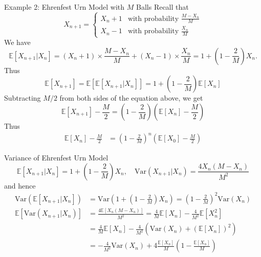 \documentclass[letterpaper]{beamer}
\def\E{\mathbb E}
\def\V{\mathrm{Var}}
\begin{document}
\begin{frame}{Example 2: Ehrenfest Urn Model with $M$ Balls}
Recall that
$$
X_{n+1}=
\begin{cases}
X_n+1 & \text{with probability } \frac{M-X_n}{M}\\
X_n-1 & \text{with probability } \frac{X_n}{M}
\end{cases}
$$
We have
$$
\E[X_{n+1}|X_n]=(X_n+1)\times \frac{M-X_n}{M}+(X_n-1)\times\frac{X_n}{M}=1+\left(1-\frac{2}{M}\right)X_n.
$$
Thus
$$
\E[X_{n+1}]=\E[\E[X_{n+1}|X_n]]=1+\left(1-\frac{2}{M}\right)\E[X_n]
$$
Subtracting $M/2$ from both sides of the equation above, we get
$$
\E[X_{n+1}]-\frac{M}{2}=\left(1-\frac{2}{M}\right)(\E[X_n]-\frac{M}{2})
$$
Thus
\begin{align*}
\E[X_n]-\frac{M}{2}
&=\left(1-\frac{2}{M}\right)^n(\E[X_{0}]-\frac{M}{2})
\end{align*}
\end{frame}
\begin{frame}{Variance of Ehrenfest Urn Model}
$$
\E[X_{n+1}|X_n] = 1+\left(1-\frac{2}{M}\right)X_n,\quad \V(X_{n+1}|X_n) = \frac{4X_n(M-X_n)}{M^2}
$$
and hence
\begin{align*}
\V(\E[X_{n+1}|X_n]) &= \V(1+\left(1-\frac{2}{M}\right)X_n)=\left(1-\frac{2}{M}\right)^2\V(X_n)\\
\E[\V(X_{n+1}|X_n)] &= \frac{4\E[X_n(M-X_n)]}{M^2}=\frac{4}{M}\E[X_n]-\frac{4}{M^2}\E[X_n^2]\\
&=\frac{4}{M}\E[X_n]-\frac{4}{M^2}\left(\V(X_n)+(\E[X_n])^2\right)\\
&=-\frac{4}{M^2}\V(X_n)+4\frac{\E[X_n]}{M}\left(1-\frac{\E[X_n]}{M}\right)
\end{align*}
\end{frame}
\end{document}

